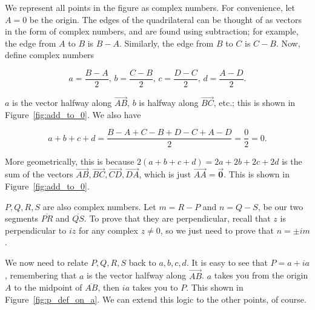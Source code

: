 \documentclass[../gatm.tex]{subfiles}
\begin{document}
We represent all points in the figure as complex numbers. For convenience, let $A=0$ be the origin. The edges of the quadrilateral can be thought of as vectors in the form of complex numbers, and are found using subtraction; for example, the edge from $A$ to $B$ is $B-A$. Similarly, the edge from $B$ to $C$ is $C-B$. Now, define complex numbers

$$a=\frac{B-A}{2},\, b=\frac{C-B}{2},\, c = \frac{D-C}{2},\, d = \frac{A-D}{2}.$$

\noindent$a$ is the vector halfway along $\overrightarrow{AB}$, $b$ is halfway along $\overrightarrow{BC}$, etc.; this is shown in Figure~\ref{fig:add_to_0}. We also have

$$a+b+c+d=\frac{B-A+C-B+D-C+A-D}{2}=\frac{0}{2}=0.$$

\noindent More geometrically, this is because $2(a+b+c+d)=2a+2b+2c+2d$ is the sum of the vectors $\overrightarrow{AB}, \overrightarrow{BC}, \overrightarrow{CD}, \overrightarrow{DA}$, which is just $\overrightarrow{AA}=\overrightarrow{\mathbf{0}}$. This is shown in Figure~\ref{fig:add_to_0}.

$P,Q,R,S$ are also complex numbers. Let $m=R-P$ and $n = Q-S$, be our two segments $\overline{PR}$ and $\overline{QS}$. To prove that they are perpendicular, recall that $z$ is perpendicular to $iz$ for any complex $z\neq 0$, so we just need to prove that $n=\pm im$.

We now need to relate $P,Q,R,S$ back to $a,b,c,d$. It is easy to see that $P = a+ia$, remembering that $a$ is the vector halfway along $\overrightarrow{AB}$. $a$ takes you from the origin $A$ to the midpoint of $\overline{AB}$, then $ia$ takes you to $P$. This shown in Figure~\ref{fig:p_def_on_a}. We can extend this logic to the other points, of course.

\end{document}
